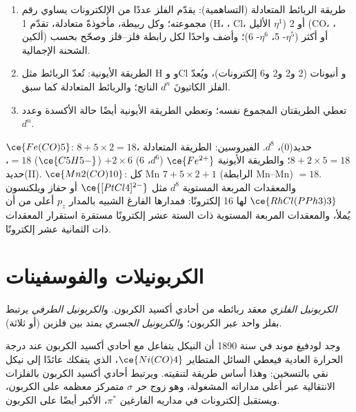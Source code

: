 \begin{method}\label{met:b3:organometallic-bonding:count}
\begin{enumerate}
  \item طريقة الربائط المتعادلة (التساهمية): يقدّم الفلز عددًا من الإلكترونات يساوي رقم
        مجموعته؛ وكل ربيطة، مأخوذةً متعادلة، تقدّم 1 (H، ، Cl،
        الأليل $\eta^1$) أو 2 (CO، ، ألكين) أو أكثر ($\eta^5$- 5، $\eta^6$- 6)؛ وأضف واحدًا لكل
        رابطة فلز--فلز وصحّح بحسب الشحنة الإجمالية.
  \item الطريقة الأيونية: تُعدّ الربائط مثل H و وCl و أنيونات (2 و2
        و2 و6 إلكترونات)، ويُعدّ الفلز الكاتيونَ $d^n$ الناتج؛ والربائط المتعادلة
        كما سبق.
  \item تعطي الطريقتان المجموع نفسه؛ وتعطي الطريقة الأيونية أيضًا حالة الأكسدة
        وعدد $d^n$.
\end{enumerate}
\end{method}

\begin{example}[العدّ]\label{ex:b3:organometallic-bonding:count}
$\ce{Fe(CO)5}$: $8 + 5 \times 2 = 18$، حديد(0)، $d^8$. الفيروسين: الطريقة المتعادلة $8 + 2 \times 5 = 18$؛ والطريقة الأيونية
$\ce{Fe^{2+}}$ ($d^6$، 6) $+ 2 \times 6$ ($\ce{C5H5-}$) $= 18$، حديد(II). $\ce{Mn2(CO)10}$: كل Mn $7 + 5 \times 2 + 1$ (الرابطة Mn--Mn)
$= 18$. والمعقدات المربعة المستوية $d^8$ مثل $\ce{[PtCl4]^{2-}}$ أو حفاز ويلكنسون
$\ce{RhCl(PPh3)3}$ لها 16 إلكترونًا: فمدارها الفارغ الشبيه بالمدار $p_z$ أعلى من أن يُملأ، 
والمعقدات المربعة المستوية ذات الستة عشر إلكترونًا مستقرة استقرار المعقدات ذات الثمانية عشر إلكترونًا.
\end{example}

\section{الكربونيلات والفوسفينات}

\begin{definition}\label{def:b3:organometallic-bonding:carbonyl}
\emph{الكربونيل الفلزي} معقد ربائطه من أحادي أكسيد
الكربون. و\emph{الكربونيل الطرفي} يرتبط بفلز
واحد عبر الكربون؛ و\emph{الكربونيل الجسري} يمتد
بين فلزين (أو ثلاثة).
\end{definition}

وجد لودفيغ موند في سنة 1890 أن النيكل يتفاعل مع أحادي أكسيد الكربون عند درجة
الحرارة العادية فيعطي السائل المتطاير $\ce{Ni(CO)4}$، الذي يتفكك عائدًا إلى نيكل
نقي بالتسخين: وهذا أساس طريقة لتنقيته. ويرتبط أحادي أكسيد الكربون
بالفلزات الانتقالية عبر أعلى مداراته المشغولة، وهو زوج حر $\sigma$ متمركز معظمه
على الكربون، ويستقبل إلكترونات في مداريه الفارغين $\pi^*$، الأكبر أيضًا على
الكربون.

